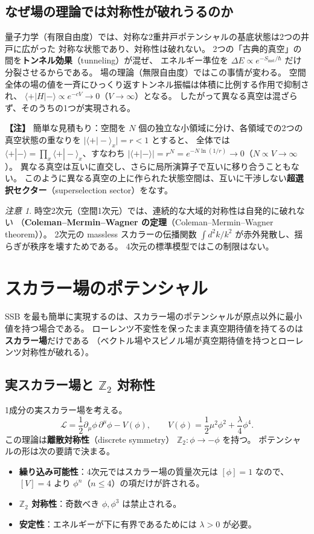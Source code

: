 \documentclass[uplatex,dvipdfmx,a4paper,11pt,openany]{jsbook}
\newcommand{\term}[2]{\textbf{#1}（#2）}
\newenvironment{note}{\vspace{1ex}\par\footnotesize\noindent\textbf{【注】}}{\par\vspace{1ex}}
\numberwithin{equation}{chapter}
\theoremstyle{definition}
\theoremstyle{plain}
\theoremstyle{remark}
\newtheorem{remark}{注意}[chapter]
\newcommand{\Lag}{\mathcal{L}}
\begin{document}
\subsection{なぜ場の理論では対称性が破れうるのか}
量子力学（有限自由度）では、対称な2重井戸ポテンシャルの基底状態は2つの井戸に広がった
対称な状態であり、対称性は破れない。
2つの「古典的真空」の間を\term{トンネル効果}{tunneling}が混ぜ、
エネルギー準位を $\Delta E\propto e^{-S_{\mathrm{inst}}/\hbar}$ だけ分裂させるからである。
場の理論（無限自由度）ではこの事情が変わる。
空間全体の場の値を一斉にひっくり返すトンネル振幅は体積に比例する作用で抑制され、
$\langle+|H|-\rangle\propto e^{-c V}\to0$（$V\to\infty$）となる。
したがって異なる真空は混ざらず、そのうちの1つが実現される。
\begin{note}
簡単な見積もり：空間を $N$ 個の独立な小領域に分け、各領域での2つの真空状態の重なりを $|\langle+|-\rangle_x|=r<1$ とすると、
全体では $\langle+|-\rangle=\prod_x\langle+|-\rangle_x$、すなわち $|\langle+|-\rangle|=r^N=e^{-N\ln(1/r)}\to0$（$N\propto V\to\infty$）。
異なる真空は互いに直交し、さらに局所演算子で互いに移り合うこともない。
このように異なる真空の上に作られた状態空間は、互いに干渉しない\term{超選択セクター}{superselection sector}をなす。
\end{note}
\begin{remark}
時空2次元（空間1次元）では、連続的な大域的対称性は自発的に破れない
（\term{Coleman--Mermin--Wagner の定理}{Coleman--Mermin--Wagner theorem}）。
2次元の massless スカラーの伝播関数 $\int d^2k/k^2$ が赤外発散し、揺らぎが秩序を壊すためである。
4次元の標準模型ではこの制限はない。
\end{remark}
\section{スカラー場のポテンシャル}
\label{sec:scalar-potential}
SSB を最も簡単に実現するのは、スカラー場のポテンシャルが原点以外に最小値を持つ場合である。
ローレンツ不変性を保ったまま真空期待値を持てるのは\textbf{スカラー場}だけである
（ベクトル場やスピノル場が真空期待値を持つとローレンツ対称性が破れる）。
\subsection{実スカラー場と $\mathbb Z_2$ 対称性}
1成分の実スカラー場を考える。
\begin{equation}
\Lag=\frac12\partial_\mu\phi\,\partial^\mu\phi-V(\phi),
\qquad
V(\phi)=\frac12\mu^2\phi^2+\frac\lambda4\phi^4 .
\label{eq:Z2-potential}
\end{equation}
この理論は\term{離散対称性}{discrete symmetry} $\mathbb Z_2:\phi\to-\phi$ を持つ。
ポテンシャルの形は次の要請で決まる。
\begin{itemize}
    \item \textbf{繰り込み可能性}：4次元ではスカラー場の質量次元は $[\phi]=1$ なので、
    $[V]=4$ より $\phi^n$（$n\le4$）の項だけが許される。
    \item \textbf{$\mathbb Z_2$ 対称性}：奇数べき $\phi,\phi^3$ は禁止される。
    \item \textbf{安定性}：エネルギーが下に有界であるためには $\lambda>0$ が必要。
\end{itemize}
\end{document}
